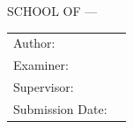 \begin{titlepage}
  \centering


  \vspace{5mm}
  {\huge\MakeUppercase{School of \getSchool{} --- \getFaculty{}} \par}

  \vspace{5mm}
  {\large\MakeUppercase{\getUniversity{}} \par}

  \vspace{20mm}
  {\Large \getDoctype{} \par}

  \vspace{15mm}
  {\huge\bfseries \getTitle{} \par}


  \vspace{15mm}
  \begin{tabular}{l l}
    Author:           & \getAuthor{}         \\
    Examiner:         & \getSupervisor{}     \\
    Supervisor:       & \getAdvisor{}        \\
    Submission Date:  & \getSubmissionDate{} \\
  \end{tabular}

\end{titlepage}
